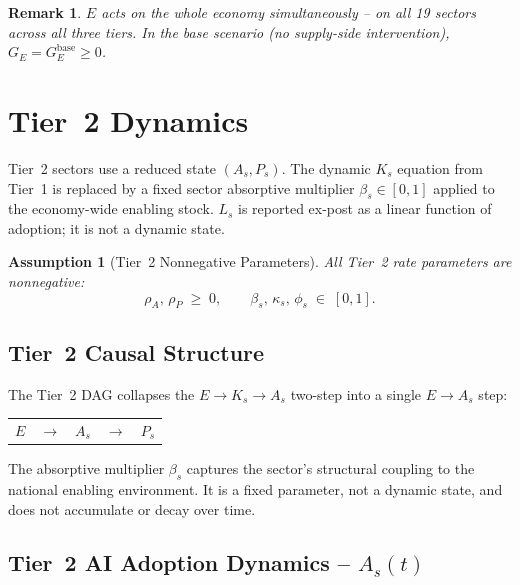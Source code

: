 \documentclass[11pt,a4paper]{article}
\newtheorem{assumption}{Assumption}
\newtheorem{remark}{Remark}
\begin{document}
\begin{remark}
$E$ acts on the whole economy simultaneously -- on all 19 sectors across all three tiers. In the base scenario (no supply-side intervention), $G_E = G_E^{\text{base}} \geq 0$.
\end{remark}

\section{Tier~2 Dynamics}
\label{sec:tier2}

Tier~2 sectors use a reduced state $(A_s, P_s)$. The dynamic $K_s$ equation from Tier~1 is replaced by a fixed sector absorptive multiplier $\beta_s \in [0,1]$ applied to the economy-wide enabling stock. $L_s$ is reported ex-post as a linear function of adoption; it is not a dynamic state.

\begin{assumption}[Tier~2 Nonnegative Parameters]
All Tier~2 rate parameters are nonnegative:
\[
\rho_A,\, \rho_P \;\geq\; 0, \qquad \beta_s,\, \kappa_s,\, \phi_s \;\in\; [0,1].
\]
\end{assumption}

\subsection{Tier~2 Causal Structure}

The Tier~2 DAG collapses the $E \to K_s \to A_s$ two-step into a single $E \to A_s$ step:

\begin{center}
\begin{tabular}{ccccc}
$E$ & $\rightarrow$ & $A_s$ & $\rightarrow$ & $P_s$ \\
\end{tabular}
\end{center}

The absorptive multiplier $\beta_s$ captures the sector's structural coupling to the national enabling environment. It is a fixed parameter, not a dynamic state, and does not accumulate or decay over time.

\subsection{Tier~2 AI Adoption Dynamics -- \texorpdfstring{$A_s(t)$}{As(t)}}
\end{document}
